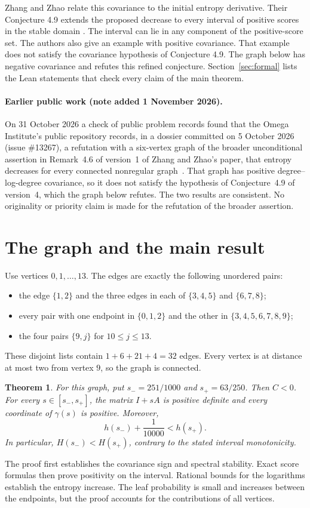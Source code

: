 \documentclass[11pt,a4paper]{article}
\newtheorem{theorem}{Theorem}
\begin{document}
Zhang and Zhao relate this covariance to the initial entropy derivative.
Their Conjecture 4.9 extends the proposed decrease to every interval of
positive scores in the stable domain \cite{zhangzhao}.
The interval can lie in any component of the positive-score set.
The authors also give an example with positive covariance.
That example does not satisfy the covariance hypothesis of Conjecture 4.9.
The graph below has negative covariance and refutes this refined conjecture.
Section~\ref{sec:formal} lists the Lean statements that check every claim of
the main theorem.

\paragraph{Earlier public work (note added 1 November 2026).}
On 31 October 2026 a check of public problem records found that the Omega
Institute's public repository records, in a dossier committed on 5 October
2026 (issue \#13267), a refutation with a six-vertex graph of the broader
unconditional assertion in Remark~4.6 of version~1 of Zhang and Zhao's
paper, that entropy decreases for every connected nonregular
graph~\cite{omega13267}. That graph has positive degree--log-degree
covariance, so it does not satisfy the hypothesis of Conjecture~4.9 of
version~4, which the graph below refutes. The two results are consistent.
No originality or priority claim is made for the refutation of the broader
assertion.

\section{The graph and the main result}
Use vertices $0,1,\ldots,13$. The edges are exactly the following unordered pairs:
\begin{itemize}
\item the edge $\{1,2\}$ and the three edges in each of
$\{3,4,5\}$ and $\{6,7,8\}$;
\item every pair with one endpoint in $\{0,1,2\}$ and the other in
$\{3,4,5,6,7,8,9\}$;
\item the four pairs $\{9,j\}$ for $10\leq j\leq13$.
\end{itemize}
These disjoint lists contain $1+6+21+4=32$ edges.
Every vertex is at distance at most two from vertex $9$, so the graph is connected.

\begin{theorem}\label{thm:main}
For this graph, put $s_-=251/1000$ and $s_+=63/250$.
Then $C<0$. For every $s\in[s_-,s_+]$, the matrix $I+sA$ is positive
definite and every coordinate of $\gamma(s)$ is positive. Moreover,
\[
 h(s_-)+\frac1{10000}<h(s_+).
\]
In particular, $H(s_-)<H(s_+)$, contrary to the stated interval monotonicity.
\end{theorem}
The proof first establishes the covariance sign and spectral stability.
Exact score formulas then prove positivity on the interval.
Rational bounds for the logarithms establish the entropy increase.
The leaf probability is small and increases between the endpoints,
but the proof accounts for the contributions of all vertices.
\end{document}
